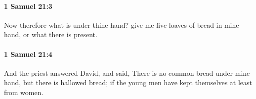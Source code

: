 		\paragraph{1 Samuel 21:3} %
			\label{1SAMUEL-21-3}

			Now therefore what is under thine hand? give me five loaves of bread in mine hand, or what there is present.


		\paragraph{1 Samuel 21:4} %
			\label{1SAMUEL-21-4}

			And the priest answered David, and said, There is no common bread under mine hand, but there is hallowed bread; if the young men have kept themselves at least from women.


